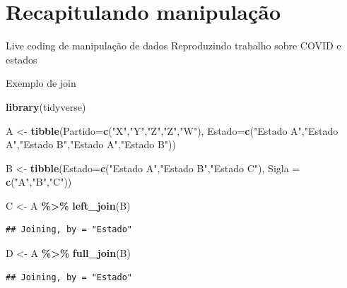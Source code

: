 \documentclass[
  9pt,
  ignorenonframetext,
]{beamer}
\newenvironment{Shaded}{\begin{snugshade}}{\end{snugshade}}
\newcommand{\DataTypeTok}[1]{\textcolor[rgb]{0.13,0.29,0.53}{#1}}
\newcommand{\KeywordTok}[1]{\textcolor[rgb]{0.13,0.29,0.53}{\textbf{#1}}}
\newcommand{\NormalTok}[1]{#1}
\newcommand{\OperatorTok}[1]{\textcolor[rgb]{0.81,0.36,0.00}{\textbf{#1}}}
\newcommand{\StringTok}[1]{\textcolor[rgb]{0.31,0.60,0.02}{#1}}
\begin{document}
\hypertarget{recapitulando-manipulauxe7uxe3o}{%
\section{Recapitulando
manipulação}\label{recapitulando-manipulauxe7uxe3o}}

\begin{frame}{Live coding de manipulação de dados}
\protect\hypertarget{live-coding-de-manipulauxe7uxe3o-de-dados}{}
Reproduzindo trabalho sobre COVID e estados
\end{frame}

\begin{frame}[fragile]{Exemplo de join}
\protect\hypertarget{exemplo-de-join}{}
\begin{Shaded}
\begin{Highlighting}[]
\KeywordTok{library}\NormalTok{(tidyverse)}

\NormalTok{A \textless{}{-}}\StringTok{ }\KeywordTok{tibble}\NormalTok{(}\DataTypeTok{Partido=}\KeywordTok{c}\NormalTok{(}\StringTok{"X"}\NormalTok{,}\StringTok{"Y"}\NormalTok{,}\StringTok{"Z"}\NormalTok{,}\StringTok{"Z"}\NormalTok{,}\StringTok{"W"}\NormalTok{),}
            \DataTypeTok{Estado=}\KeywordTok{c}\NormalTok{(}\StringTok{"Estado A"}\NormalTok{,}\StringTok{"Estado A"}\NormalTok{,}\StringTok{"Estado B"}\NormalTok{,}\StringTok{"Estado A"}\NormalTok{,}\StringTok{"Estado B"}\NormalTok{))}

\NormalTok{B \textless{}{-}}\StringTok{ }\KeywordTok{tibble}\NormalTok{(}\DataTypeTok{Estado=}\KeywordTok{c}\NormalTok{(}\StringTok{"Estado A"}\NormalTok{,}\StringTok{"Estado B"}\NormalTok{,}\StringTok{"Estado C"}\NormalTok{),}
            \DataTypeTok{Sigla =} \KeywordTok{c}\NormalTok{(}\StringTok{"A"}\NormalTok{,}\StringTok{"B"}\NormalTok{,}\StringTok{"C"}\NormalTok{))}

\NormalTok{C \textless{}{-}}\StringTok{ }\NormalTok{A }\OperatorTok{\%\textgreater{}\%}\StringTok{ }\KeywordTok{left\_join}\NormalTok{(B)}
\end{Highlighting}
\end{Shaded}

\begin{verbatim}
## Joining, by = "Estado"
\end{verbatim}

\begin{Shaded}
\begin{Highlighting}[]
\NormalTok{D \textless{}{-}}\StringTok{ }\NormalTok{A }\OperatorTok{\%\textgreater{}\%}\StringTok{ }\KeywordTok{full\_join}\NormalTok{(B)}
\end{Highlighting}
\end{Shaded}

\begin{verbatim}
## Joining, by = "Estado"
\end{verbatim}
\end{frame}
\end{document}
